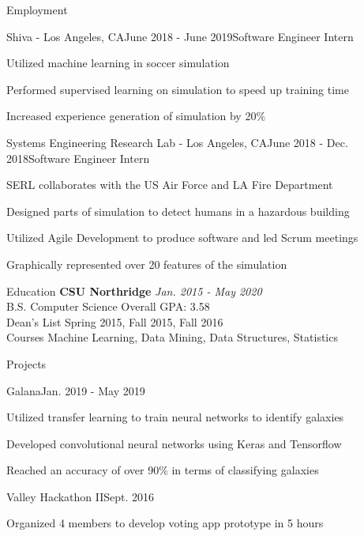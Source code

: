 \documentclass{resume}
\begin{document}
\begin{rSection}{Employment}
\begin{rSubsection}{Shiva - Los Angeles, CA}{June 2018 - June 2019}{Software Engineer Intern}{}
        \item Utilized machine learning in soccer simulation
        \item Performed supervised learning on simulation to speed up training time
        \item Increased experience generation of simulation by 20\%
    \end{rSubsection}
    \begin{rSubsection}{Systems Engineering Research Lab - Los Angeles, CA}{June 2018 - Dec. 2018}{Software Engineer Intern}{}
        \item SERL collaborates with the US Air Force and LA Fire Department
        \item Designed parts of simulation to detect humans in a hazardous building
        \item Utilized Agile Development to produce software and led Scrum meetings
        \item Graphically represented over 20 features of the simulation
    \end{rSubsection}
\end{rSection}

\begin{rSection}{Education}
    {\bf CSU Northridge} \hfill {\em Jan. 2015 - May 2020} 
    \\ B.S. Computer Science \hfill { Overall GPA: 3.58 }
    \\ Dean's List \hfill {Spring 2015, Fall 2015, Fall 2016}
    \\ Courses \hfill {Machine Learning, Data Mining, Data Structures, Statistics}
\end{rSection}

\begin{rSection}{Projects}
    \begin{rSubsection}{Galana}{Jan. 2019 - May 2019}{}{}
        \item Utilized transfer learning to train neural networks to identify galaxies
        \item Developed convolutional neural networks using Keras and Tensorflow
        \item Reached an accuracy of over 90\% in terms of classifying galaxies
    \end{rSubsection}
    \begin{rSubsection}{Valley Hackathon II}{Sept. 2016}{}{}
        \item Organized 4 members to develop voting app prototype in 5 hours
    \end{rSubsection}
\end{rSection}
\end{document}
